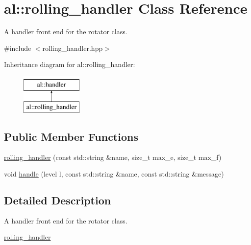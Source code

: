 \hypertarget{classal_1_1rolling__handler}{\section{al\-:\-:rolling\-\_\-handler \-Class \-Reference}
\label{classal_1_1rolling__handler}
}


\-A handler front end for the rotator class.  




{\ttfamily \#include $<$rolling\-\_\-handler.\-hpp$>$}

\-Inheritance diagram for al\-:\-:rolling\-\_\-handler\-:\begin{figure}[H]
\begin{center}
\leavevmode
\includegraphics[height=2.000000cm]{classal_1_1rolling__handler}
\end{center}
\end{figure}
\subsection*{\-Public \-Member \-Functions}
\begin{DoxyCompactItemize}
\item 
\hyperlink{classal_1_1rolling__handler_a3794e5b1bca80be34af48a037c6ecf20}{rolling\-\_\-handler} (const std\-::string \&name, size\-\_\-t max\-\_\-e, size\-\_\-t max\-\_\-f)
\item 
void \hyperlink{classal_1_1rolling__handler_aaaeaff11945ff3c2a313f465724ad8a7}{handle} (level l, const std\-::string \&name, const std\-::string \&message)
\end{DoxyCompactItemize}


\subsection{\-Detailed \-Description}
\-A handler front end for the rotator class. 

\hyperlink{classal_1_1rolling__handler}{rolling\-\_\-handler} 

